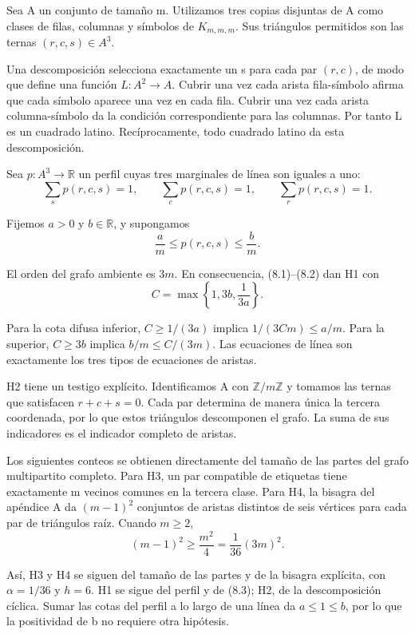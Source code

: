 \documentclass[spanish,11pt,a4paper]{article}
\begin{document}
Sea A un conjunto de tamaño m. Utilizamos tres copias disjuntas de A como clases de filas, columnas y símbolos de \(K_{m,m,m}\). Sus triángulos permitidos son las ternas \((r,c,s)\in A^3\).

Una descomposición selecciona exactamente un s para cada par \((r,c)\), de modo que define una función \(L:A^2\to A\). Cubrir una vez cada arista fila-símbolo afirma que cada símbolo aparece una vez en cada fila. Cubrir una vez cada arista columna-símbolo da la condición correspondiente para las columnas. Por tanto L es un cuadrado latino. Recíprocamente, todo cuadrado latino da esta descomposición.

Sea \(p:A^3\to\mathbb R\) un perfil cuyas tres marginales de línea son iguales a uno:
\[\sum_s p(r,c,s)=1,\qquad
\sum_c p(r,c,s)=1,\qquad
\sum_r p(r,c,s)=1.                                                  \tag{8.1}\]

Fijemos \(a>0\) y \(b\in\mathbb R\), y supongamos
\[\frac a m\leq p(r,c,s)\leq\frac b m.                               \tag{8.2}\]

El orden del grafo ambiente es \(3m\). En consecuencia, (8.1)--(8.2) dan H1 con
\[C=\max\left\{1,3b,\frac1{3a}\right\}.                             \tag{8.3}\]

Para la cota difusa inferior, \(C\geq1/(3a)\) implica \(1/(3Cm)\leq a/m\). Para la superior, \(C\geq3b\) implica \(b/m\leq C/(3m)\). Las ecuaciones de línea son exactamente los tres tipos de ecuaciones de aristas.

H2 tiene un testigo explícito. Identificamos A con \(\mathbb Z/m\mathbb Z\) y tomamos las ternas que satisfacen \(r+c+s=0\). Cada par determina de manera única la tercera coordenada, por lo que estos triángulos descomponen el grafo. La suma de sus indicadores es el indicador completo de aristas.

Los siguientes conteos se obtienen directamente del tamaño de las partes del grafo multipartito completo. Para H3, un par compatible de etiquetas tiene exactamente m vecinos comunes en la tercera clase. Para H4, la bisagra del apéndice A da \((m-1)^2\) conjuntos de aristas distintos de seis vértices para cada par de triángulos raíz. Cuando \(m\geq2\),
\[(m-1)^2\geq\frac{m^2}{4}
=\frac1{36}(3m)^2.                                                 \tag{8.4}\]

Así, H3 y H4 se siguen del tamaño de las partes y de la bisagra explícita, con \(\alpha=1/36\) y \(h=6\). H1 se sigue del perfil y de (8.3); H2, de la descomposición cíclica. Sumar las cotas del perfil a lo largo de una línea da \(a\leq1\leq b\), por lo que la positividad de b no requiere otra hipótesis.
\end{document}

